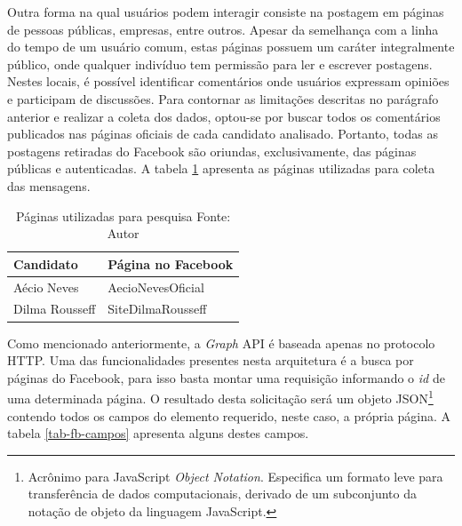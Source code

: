 Outra forma na qual usuários podem interagir consiste na postagem em páginas de pessoas públicas, empresas, entre outros. Apesar da semelhança com a linha do tempo de um usuário comum, estas páginas possuem um caráter integralmente público, onde qualquer indivíduo tem permissão para ler e escrever postagens. Nestes locais, é possível identificar comentários onde usuários expressam opiniões e participam de discussões. Para contornar as limitações descritas no parágrafo anterior e realizar a coleta dos dados, optou-se por buscar todos os comentários publicados nas páginas oficiais de cada candidato analisado. Portanto, todas as postagens retiradas do Facebook são oriundas, exclusivamente, das páginas públicas e autenticadas. A tabela \ref{tab-fb-pags} apresenta as páginas utilizadas para coleta das mensagens.	

\begin{table}[!ht]
\begin{center}
  \begin{tabular}{|p{5cm}|p{5cm}|}
	\hline
	Candidato & Página no Facebook
	\\ \hline
	Aécio Neves & AecioNevesOficial
	\\ \hline
	Dilma Rousseff & SiteDilmaRousseff
	\\ \hline
  \end{tabular}
  \captionsetup{justification=centering}
  \caption[Páginas utilizadas para pesquisa]{Páginas utilizadas para pesquisa
  \protect\linebreak Fonte: Autor}
\label{tab-fb-pags}
\end{center}
\end{table}
\FloatBarrier

Como mencionado anteriormente, a \textit{Graph} API é baseada apenas no protocolo HTTP. Uma das funcionalidades presentes nesta arquitetura é a busca por páginas do Facebook, para isso basta montar uma requisição informando o \textit{id} de uma determinada página. O resultado desta solicitação será um objeto JSON\footnote{Acrônimo para JavaScript \textit{Object Notation}. Especifica um formato leve para transferência de dados computacionais, derivado de um subconjunto da notação de objeto da linguagem JavaScript.} contendo todos os campos do elemento requerido, neste caso, a própria página. A tabela \ref{tab-fb-campos} apresenta alguns destes campos.

